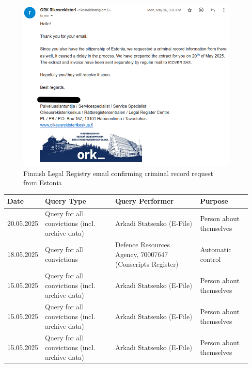 \begin{figure}[H]
\centering
\includegraphics[width=450px]{english/figures/Screenshot from 2025-08-09 11-59-33.png}
\caption{Finnish Legal Registry email confirming criminal record request from Estonia\cite{e-toimik-screenshot}}
\label{fig:finnish-legal-registry-email}
\end{figure}

\begin{small}
\begin{center}
\begin{tabular}{|p{2.5cm}|p{4.5cm}|p{4cm}|p{2.5cm}|}
\hline
\textbf{Date} & \textbf{Query Type} & \textbf{Query Performer} & \textbf{Purpose} \\
\hline
20.05.2025 & Query for all convictions (incl. archive data) & Arkadi Statsenko (E-File) & Person about themselves \\
\hline
18.05.2025 & Query for all convictions & Defence Resources Agency, 70007647 (Conscripts Register) & Automatic control \\
\hline
15.05.2025 & Query for all convictions (incl. archive data) & Arkadi Statsenko (E-File) & Person about themselves \\
\hline
15.05.2025 & Query for all convictions (incl. archive data) & Arkadi Statsenko (E-File) & Person about themselves \\
\hline
15.05.2025 & Query for all convictions (incl. archive data) & Arkadi Statsenko (E-File) & Person about themselves \\
\hline
\end{tabular}
\end{center}
\end{small}


